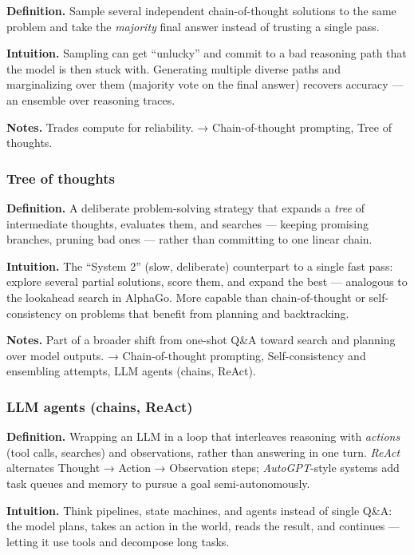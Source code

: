 \documentclass[
  10pt,
  letterpaper,
  onecolumn]{article}
\begin{document}
\textbf{Definition.} Sample several independent chain-of-thought
solutions to the same problem and take the \emph{majority} final answer
instead of trusting a single pass.

\textbf{Intuition.} Sampling can get ``unlucky'' and commit to a bad
reasoning path that the model is then stuck with. Generating multiple
diverse paths and marginalizing over them (majority vote on the final
answer) recovers accuracy --- an ensemble over reasoning traces.

\textbf{Notes.} Trades compute for reliability. → Chain-of-thought
prompting, Tree of thoughts.

\hypertarget{tree-of-thoughts}{%
\subsubsection{Tree of thoughts}\label{tree-of-thoughts}}

\textbf{Definition.} A deliberate problem-solving strategy that expands
a \emph{tree} of intermediate thoughts, evaluates them, and searches ---
keeping promising branches, pruning bad ones --- rather than committing
to one linear chain.

\textbf{Intuition.} The ``System 2'' (slow, deliberate) counterpart to a
single fast pass: explore several partial solutions, score them, and
expand the best --- analogous to the lookahead search in AlphaGo. More
capable than chain-of-thought or self-consistency on problems that
benefit from planning and backtracking.

\textbf{Notes.} Part of a broader shift from one-shot Q\&A toward search
and planning over model outputs. → Chain-of-thought prompting,
Self-consistency and ensembling attempts, LLM agents (chains, ReAct).

\hypertarget{llm-agents-chains-react}{%
\subsubsection{LLM agents (chains,
ReAct)}\label{llm-agents-chains-react}}

\textbf{Definition.} Wrapping an LLM in a loop that interleaves
reasoning with \emph{actions} (tool calls, searches) and observations,
rather than answering in one turn. \emph{ReAct} alternates Thought →
Action → Observation steps; \emph{AutoGPT}-style systems add task queues
and memory to pursue a goal semi-autonomously.

\textbf{Intuition.} Think pipelines, state machines, and agents instead
of single Q\&A: the model plans, takes an action in the world, reads the
result, and continues --- letting it use tools and decompose long tasks.
\end{document}
